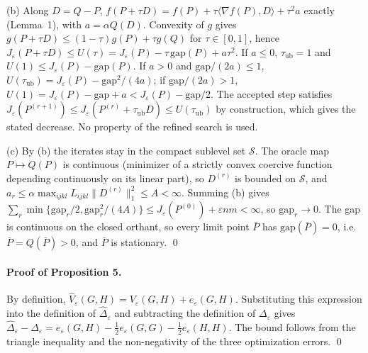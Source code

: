 \documentclass[12pt]{article}
\begin{document}
(b) Along $D=Q-P$, $f(P+\tau D)=f(P)+\tau\langle\nabla f(P),D\rangle+\tau^2a$ exactly (Lemma~1), with $a=\alpha Q(D)$. Convexity of $g$ gives $g(P+\tau D)\le(1-\tau)g(P)+\tau g(Q)$ for $\tau\in[0,1]$, hence $J_\varepsilon(P+\tau D)\le U(\tau)=J_\varepsilon(P)-\tau\,\mathrm{gap}(P)+a\tau^2$. If $a\le0$, $\tau_{\mathrm{ub}}=1$ and $U(1)\le J_\varepsilon(P)-\mathrm{gap}(P)$. If $a>0$ and $\mathrm{gap}/(2a)\le1$, $U(\tau_{\mathrm{ub}})=J_\varepsilon(P)-\mathrm{gap}^2/(4a)$; if $\mathrm{gap}/(2a)>1$, $U(1)=J_\varepsilon(P)-\mathrm{gap}+a<J_\varepsilon(P)-\mathrm{gap}/2$. The accepted step satisfies $J_\varepsilon(P^{(r+1)})\le J_\varepsilon(P^{(r)}+\tau_{\mathrm{ub}}D)\le U(\tau_{\mathrm{ub}})$ by construction, which gives the stated decrease. No property of the refined search is used.

(c) By (b) the iterates stay in the compact sublevel set $\mathcal S$. The oracle map $P\mapsto Q(P)$ is continuous (minimizer of a strictly convex coercive function depending continuously on its linear part), so $D^{(r)}$ is bounded on $\mathcal S$, and $a_r\le\alpha\max_{ijkl}L_{ijkl}\|D^{(r)}\|_1^2\le A<\infty$. Summing (b) gives $\sum_r\min\{\mathrm{gap}_r/2,\mathrm{gap}_r^2/(4A)\}\le J_\varepsilon(P^{(0)})+\varepsilon nm<\infty$, so $\mathrm{gap}_r\to0$. The gap is continuous on the closed orthant, so every limit point $\bar P$ has $\mathrm{gap}(\bar P)=0$, i.e.\ $\bar P=Q(\bar P)>0$, and $\bar P$ is stationary. \qed

\paragraph{Proof of Proposition 5.}
By definition, $\widehat V_\varepsilon(G,H)=V_\varepsilon(G,H)+e_\varepsilon(G,H)$. Substituting this expression into the definition of $\widehat\Delta_\varepsilon$ and subtracting the definition of $\Delta_\varepsilon$ gives $\widehat\Delta_\varepsilon-\Delta_\varepsilon=e_\varepsilon(G,H)-\frac12e_\varepsilon(G,G)-\frac12e_\varepsilon(H,H)$. The bound follows from the triangle inequality and the non-negativity of the three optimization errors.
\qed
\end{document}
